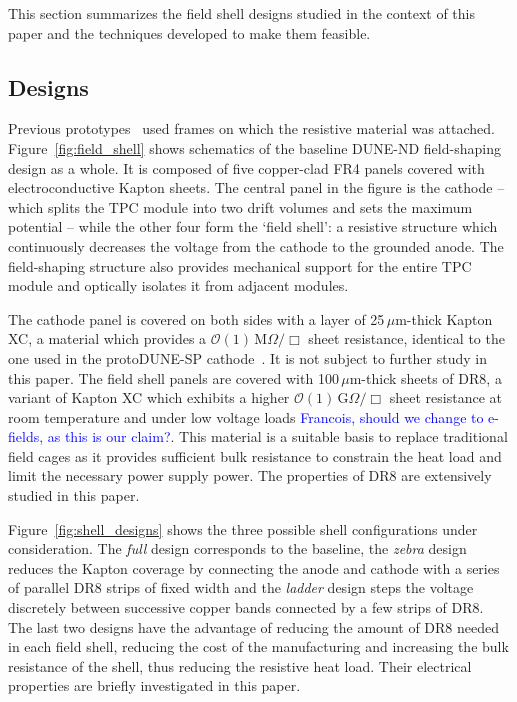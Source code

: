 \documentclass[a4paper,12pt]{article}
\newcommand{\DR}{DR8}
\newcommand{\RI}[1]{\textcolor{blue}{#1}}
\begin{document}
This section summarizes the field shell designs studied in the context of this paper and the techniques developed to make them feasible.

\subsection{Designs}
Previous prototypes~\cite{bern_lartpc,srmu_tpc} used frames on which the resistive material was attached. Figure~\ref{fig:field_shell} shows schematics of the baseline DUNE-ND field-shaping design as a whole. It is composed of five copper-clad FR4 panels covered with electroconductive Kapton sheets. The central panel in the figure is the cathode -- which splits the TPC module into two drift volumes and sets the maximum potential -- while the other four form the `field shell': a resistive structure which continuously decreases the voltage from the cathode to the grounded anode. The field-shaping structure also provides mechanical support for the entire TPC module and optically isolates it from adjacent modules.



The cathode panel is covered on both sides with a layer of 25\,$\mu$m-thick Kapton XC, a material which provides a $\mathcal{O}(1)\,$M$\Omega/\Box$ sheet resistance, identical to the one used in the protoDUNE-SP cathode~\cite{protodune_sp_tdr}. It is not subject to further study in this paper. The field shell panels are covered with 100\,$\mu$m-thick sheets of {\DR}, a variant of Kapton XC which exhibits a higher $\mathcal{O}(1)\,$G$\Omega/\Box$ sheet resistance at room temperature and under low voltage loads \RI{ Francois, should we change to e-fields, as this is our claim?}. This material is a suitable basis to replace traditional field cages as it provides sufficient bulk resistance to constrain the heat load and limit the necessary power supply power. The properties of {\DR} are extensively studied in this paper.


Figure~\ref{fig:shell_designs} shows the three possible shell configurations under consideration. The \textit{full} design corresponds to the baseline, the \textit{zebra} design reduces the Kapton coverage by connecting the anode and cathode with a series of parallel {\DR} strips of fixed width and the \textit{ladder} design steps the voltage discretely between successive copper bands connected by a few strips of {\DR}. The last two designs have the advantage of reducing the amount of {\DR} needed in each field shell, reducing the cost of the manufacturing and increasing the bulk resistance of the shell, thus reducing the resistive heat load. Their electrical properties are briefly investigated in this paper.
\end{document}
